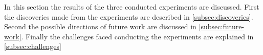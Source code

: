 In this section the results of the three conducted experiments are discussed. First the discoveries made from the experiments are described in \ref{subsec:discoveries}. Second the possible directions of future work are discussed in \ref{subsec:future-work}. Finally the challenges faced conducting the experiments are explained in \ref{subsec:challenges}

 \\
 \\
